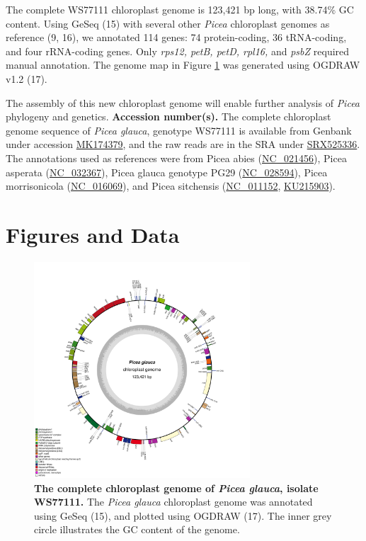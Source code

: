 \documentclass[titlepage,11pt, oneside]{article}   	%
\begin{document}
\newline
\par
The complete WS77111 chloroplast genome is 123,421 bp long, with 38.74\% GC content. Using GeSeq (15) with several other \textit{Picea} chloroplast genomes as reference (9, 16), we annotated 114 genes: 74 protein-coding, 36 tRNA-coding, and four rRNA-coding genes. Only \textit{rps12, petB, petD, rpl16,} and \textit{psbZ} required manual annotation. The genome map in Figure \ref{fig:ogdraw} was generated using OGDRAW v1.2 (17).
\newline
\par
The assembly of this new chloroplast genome will enable further analysis of \textit{Picea} phylogeny and genetics.
\newline
\newline
\textbf{Accession number(s).} The complete chloroplast genome sequence of \textit{Picea glauca}, genotype WS77111 is available from Genbank under accession \href{https://www.ncbi.nlm.nih.gov/nuccore/MK174379}{MK174379}, and the raw reads are in the SRA under \href{https://www.ncbi.nlm.nih.gov/sra/SRX525336}{SRX525336}. The annotations used as references were from Picea abies (\href{https://www.ncbi.nlm.nih.gov/nuccore/NC_021456}{NC\_021456}), Picea asperata (\href{https://www.ncbi.nlm.nih.gov/nuccore/NC_032367}{NC\_032367}), Picea glauca genotype PG29 (\href{https://www.ncbi.nlm.nih.gov/nuccore/NC_028594}{NC\_028594}), Picea morrisonicola (\href{https://www.ncbi.nlm.nih.gov/nuccore/NC_016069}{NC\_016069}), and Picea sitchensis (\href{https://www.ncbi.nlm.nih.gov/nuccore/NC_011152}{NC\_011152}, \href{https://www.ncbi.nlm.nih.gov/nuccore/KU215903}{KU215903}).

\section*{Figures and Data}
\begin{figure}[h]
\centering
\includegraphics[width=0.72\textwidth]{WS77111}
\caption{\textbf{The complete chloroplast genome of \textit{Picea glauca}, isolate WS77111.} The \textit{Picea glauca} chloroplast genome was annotated using GeSeq (15), and plotted using OGDRAW (17). The inner grey circle illustrates the GC content of the genome.}
\label{fig:ogdraw}
\end{figure}
\end{document}
